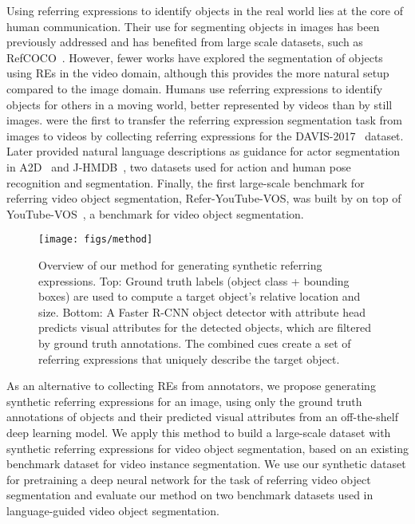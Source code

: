 \documentclass[11pt]{article}
\begin{document}
Using referring expressions to identify objects in the real world lies at the core of human communication. 
Their use for segmenting objects in images has been previously addressed \citep{hu2016segmentation, liu2017recurrent, yu2018mattnet, ye2019cross, chen2019see} and has benefited from large scale datasets, such as  RefCOCO~\citep{kazemzadeh2014referitgame}. 
However, fewer works have explored the segmentation of objects using REs in the video domain, 
although this provides the more natural setup compared to the image domain. 
Humans use referring expressions to identify objects for others in a moving world, better represented by videos than by still images.
\citet{khoreva2018video} were the first to transfer the referring expression segmentation task from images to videos by collecting referring expressions for the DAVIS-2017~\citep{Pont-Tuset_arXiv_2017} dataset. 
Later \citet{gavrilyuk2018actor} provided natural language descriptions as guidance for actor segmentation in A2D~\citep{XuHsXiCVPR2015} and J-HMDB~\citep{Jhuang:ICCV:2013}, two datasets used for action and human pose recognition and segmentation. Finally, the first large-scale benchmark for referring video object segmentation, Refer-YouTube-VOS, was built by \citet{seourvos} on top of YouTube-VOS~\citep{xu2018youtube}, a benchmark for video object segmentation.





\begin{figure*}[t!]
\begin{center}
\texttt{[image: figs/method]}
\end{center}
\caption{Overview of our method for generating synthetic referring expressions. Top: Ground truth labels (object class + bounding boxes) are used to compute a target object's relative location and size. Bottom: A Faster R-CNN object detector with attribute head predicts visual attributes for the detected objects, which are filtered by ground truth annotations. The combined cues create a set of referring expressions that uniquely describe the target object.}
\label{fig:method}
\end{figure*}


As an alternative to collecting REs from annotators, we propose generating synthetic referring expressions for an image, using only the ground truth annotations of objects and their predicted visual attributes from an off-the-shelf deep learning model. We apply this method to build a large-scale dataset with synthetic referring expressions for video object segmentation, based on an existing benchmark dataset for video instance segmentation. We use our synthetic dataset for pretraining a deep neural network for the task of referring video object segmentation and evaluate our method on two benchmark datasets used in language-guided video object segmentation.
\end{document}
